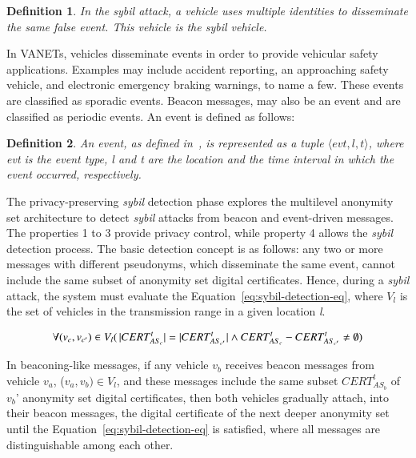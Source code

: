 \documentclass[preprint,12pt]{elsarticle}
\newtheorem{definition}{Definition}
\begin{document}

\begin{definition}
\label{def:sybil-event}
In the sybil attack, a vehicle uses multiple identities to disseminate the same false event. This vehicle is the sybil vehicle.
\end{definition}

In VANETs, vehicles disseminate events in order to provide vehicular safety applications. Examples may include accident reporting, an approaching safety vehicle, and electronic emergency braking warnings, to name a few. These events are classified as sporadic events. Beacon messages, may also be an event and are classified as periodic events. An event is defined as follows:

\begin{definition}
\label{def:event}
An event, as defined in~\cite{p2dap2}, is represented as a tuple $\langle evt, l, t \rangle$, where \textit{evt} is the event type, \textit{l} and \textit{t} are the location and the time interval in which the event occurred, respectively.
\end{definition}

The privacy-preserving \textit{sybil} detection phase explores the multilevel anonymity set architecture to detect \textit{sybil} attacks from beacon and event-driven messages. The properties 1 to 3 provide privacy control, while property 4 allows the \textit{sybil} detection process. The basic detection concept is as follows: any two or more messages with different pseudonyms, which disseminate the same event, cannot include the same subset of anonymity set digital certificates. Hence, during a \textit{sybil} attack, the system must evaluate the Equation~\ref{eq:sybil-detection-eq}, where $V_{l}$ is the set of vehicles in the transmission range in a given location \textit{l}.

\begin{equation}
\label{eq:sybil-detection-eq}
\forall (v_{c}, v_{c'}) \in V_{l} (\thinspace |CERT^{t}_{AS_{c}}| = |CERT^{t}_{AS_{c'}}| \wedge CERT^{t}_{AS_{c}} - CERT^{t}_{AS_{c'}} \neq \emptyset)
\end{equation}

In beaconing-like messages, if any vehicle $v_{b}$ receives beacon messages from vehicle $v_{a}$, ($v_{a}, v_{b}) \in V_{l}$, and these messages include the same subset $CERT^{t}_{AS_{b}}$ of $v_{b}$' anonymity set digital certificates, then both vehicles gradually attach, into their beacon messages, the digital certificate of the next deeper anonymity set until the Equation~\ref{eq:sybil-detection-eq} is satisfied, where all messages are distinguishable among each other.
\end{document}
